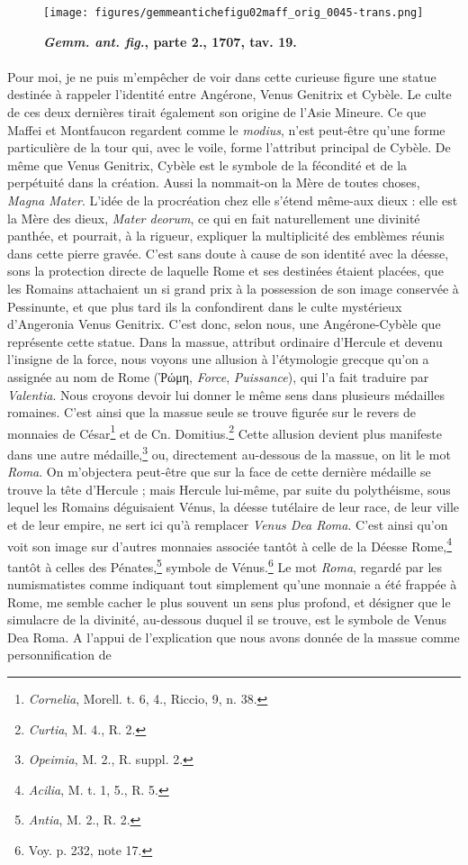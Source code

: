 \documentclass[a4paper, 11pt, oneside, polutonikogreek, french]{article}
\begin{document}
\begin{figure}[H]
\centering
\texttt{[image: figures/gemmeantichefigu02maff\_orig\_0045-trans.png]}
\caption{\bfseries \emph{Gemm. ant. fig.}, parte 2., 1707, tav. 19.}
\end{figure}
\paragraph{}
Pour moi, je ne puis m'empêcher de voir dans cette curieuse figure une statue destinée à rappeler l'identité entre Angérone, Venus Genitrix et Cybèle. Le culte de ces deux dernières tirait également son origine de l'Asie Mineure. Ce que Maffei et Montfaucon regardent comme le \emph{modius}, n'est peut-être qu'une forme particulière de la tour qui, avec le voile, forme l'attribut principal de Cybèle. De même que Venus Genitrix, Cybèle est le symbole de la fécondité et de la perpétuité dans la création. Aussi la nommait-on la Mère de toutes choses, \emph{Magna Mater}. L'idée de la procréation chez elle s'étend même-aux dieux : elle est la Mère des dieux, \emph{Mater deorum}, ce qui en fait naturellement une divinité panthée, et pourrait, à la rigueur, expliquer la multiplicité des emblèmes réunis dans cette pierre gravée. C'est sans doute à cause de son identité avec la déesse, sons la protection directe de laquelle Rome et ses destinées étaient placées, que les Romains attachaient un si grand prix à la possession de son image conservée à Pessinunte, et que plus tard ils la confondirent dans le culte mystérieux d'Angeronia Venus Genitrix. C'est donc, selon nous, une Angérone-Cybèle que représente cette statue. Dans la massue, attribut ordinaire d'Hercule et devenu l'insigne de la force, nous voyons une allusion à l'étymologie grecque qu'on a assignée au nom de Rome (Ῥώμη, \emph{Force}, \emph{Puissance}), qui l'a fait traduire par \emph{Valentia}. Nous croyons devoir lui donner le même sens dans plusieurs médailles romaines. C'est ainsi que la massue seule se trouve figurée sur le revers de monnaies de César\footnote{\emph{Cornelia}, Morell. t. 6, 4., Riccio, 9, n. 38.} et de Cn. Domitius.\footnote{\emph{Curtia}, M. 4., R. 2.} Cette allusion devient plus manifeste dans une autre médaille,\footnote{\emph{Opeimia}, M. 2., R. suppl. 2.} ou, directement au-dessous de la massue, on lit le mot \emph{Roma}. On m'objectera peut-être que sur la face de cette dernière médaille se trouve la tête d'Hercule ; mais Hercule lui-même, par suite du polythéisme, sous lequel les Romains déguisaient Vénus, la déesse tutélaire de leur race, de leur ville et de leur empire, ne sert ici qu'à remplacer \emph{Venus Dea Roma}. C'est ainsi qu'on voit son image sur d'autres monnaies associée tantôt à celle de la Déesse Rome,\footnote{\emph{Acilia}, M. t. 1, 5., R. 5.} tantôt à celles des Pénates,\footnote{\emph{Antia}, M. 2., R. 2.} symbole de Vénus.\footnote{Voy. p. 232, note 17.} Le mot \emph{Roma}, regardé par les numismatistes comme indiquant tout simplement qu'une monnaie a été frappée à Rome, me semble cacher le plus souvent un sens plus profond, et désigner que le simulacre de la divinité, au-dessous duquel il se trouve, est le symbole de Venus Dea Roma. A l'appui de l'explication que nous avons donnée de la massue comme personnification de 
\end{document}
